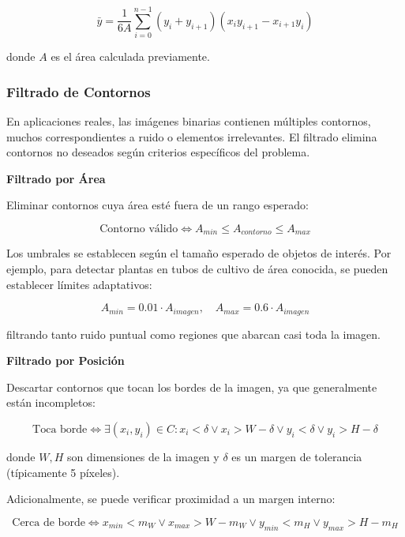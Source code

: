\begin{equation}
\bar{y} = \frac{1}{6A}\sum_{i=0}^{n-1}(y_i + y_{i+1})(x_i y_{i+1} - x_{i+1}y_i)
\end{equation}

donde $A$ es el área calculada previamente.

\subsubsection{Filtrado de Contornos}

En aplicaciones reales, las imágenes binarias contienen múltiples contornos, muchos correspondientes a ruido o elementos irrelevantes. El filtrado elimina contornos no deseados según criterios específicos del problema.

\textbf{Filtrado por Área}

Eliminar contornos cuya área esté fuera de un rango esperado:

\begin{equation}
\text{Contorno válido} \Leftrightarrow A_{min} \leq A_{contorno} \leq A_{max}
\end{equation}

Los umbrales se establecen según el tamaño esperado de objetos de interés. Por ejemplo, para detectar plantas en tubos de cultivo de área conocida, se pueden establecer límites adaptativos:

\begin{equation}
A_{min} = 0.01 \cdot A_{imagen}, \quad A_{max} = 0.6 \cdot A_{imagen}
\end{equation}

filtrando tanto ruido puntual como regiones que abarcan casi toda la imagen.

\textbf{Filtrado por Posición}

Descartar contornos que tocan los bordes de la imagen, ya que generalmente están incompletos:

\begin{equation}
\text{Toca borde} \Leftrightarrow \exists (x_i, y_i) \in C : x_i < \delta \lor x_i > W-\delta \lor y_i < \delta \lor y_i > H-\delta
\end{equation}

donde $W, H$ son dimensiones de la imagen y $\delta$ es un margen de tolerancia (típicamente 5 píxeles).

Adicionalmente, se puede verificar proximidad a un margen interno:

\begin{equation}
\text{Cerca de borde} \Leftrightarrow x_{min} < m_W \lor x_{max} > W - m_W \lor y_{min} < m_H \lor y_{max} > H - m_H
\end{equation}

